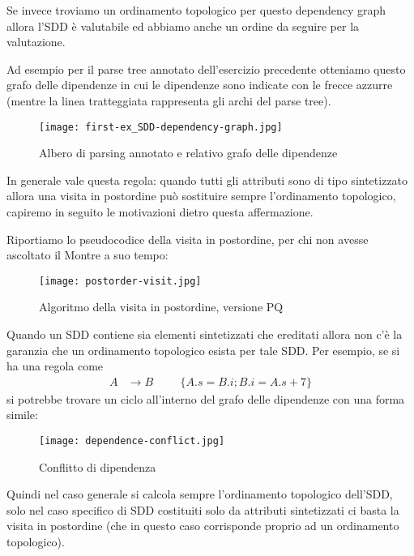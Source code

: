 \documentclass[class=book, crop=false, oneside, 12pt]{standalone}
\begin{document}
\noindent Se invece troviamo un ordinamento topologico per questo dependency graph allora l'SDD è valutabile ed abbiamo anche un ordine da seguire per la valutazione.

Ad esempio per il parse tree annotato dell'esercizio precedente otteniamo questo grafo delle dipendenze in cui le dipendenze sono indicate con le frecce azzurre (mentre la linea tratteggiata rappresenta gli archi del parse tree).
\begin{figure}[H]
    \centering
    \texttt{[image: first-ex\_SDD-dependency-graph.jpg]}
    \caption{Albero di parsing annotato e relativo grafo delle dipendenze}
    \label{fig:first-ex_SDD-dependency-graph}
\end{figure}
In generale vale questa regola: quando tutti gli attributi sono di tipo sintetizzato allora una visita in postordine può sostituire sempre l'ordinamento topologico, capiremo in seguito le motivazioni dietro questa affermazione.

Riportiamo lo pseudocodice della visita in postordine, per chi non avesse ascoltato il Montre a suo tempo:
\begin{figure}[H]
    \centering
    \texttt{[image: postorder-visit.jpg]}
    \caption{Algoritmo della visita in postordine, versione PQ}
    \label{fig:postorder-visit}
\end{figure}
Quando un SDD contiene sia elementi sintetizzati che ereditati allora non c'è la garanzia che un ordinamento topologico esista per tale SDD.
Per esempio, se si ha una regola come 
\begin{align*}
    A &\to B & & &\{A.s = B.i; B.i = A.s+7\} 
\end{align*}
si potrebbe trovare un ciclo all'interno del grafo delle dipendenze con una forma simile:
\begin{figure}[H]
    \centering
    \texttt{[image: dependence-conflict.jpg]}
    \caption{Conflitto di dipendenza}
    \label{fig:dependence-conflict}
\end{figure}
Quindi nel caso generale si calcola sempre l'ordinamento topologico dell'SDD, solo nel caso specifico di SDD costituiti solo da attributi sintetizzati ci basta la visita in postordine (che in questo caso corrisponde proprio ad un ordinamento topologico).
\end{document}
